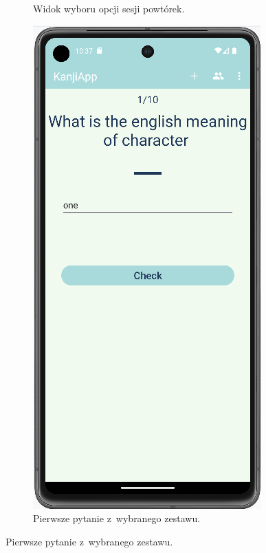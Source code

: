 \documentclass[a4paper,twoside,12pt]{book}
\begin{document}
\begin{figure}
\begin{subfigure}{0.3\textwidth}
   \caption{Widok wyboru opcji sesji powtórek.}
   \label{fig:options}
\end{subfigure}
\hfill
\begin{subfigure}{0.3\textwidth}
   \includegraphics[width=\textwidth]{learn/start}
   \caption{Pierwsze pytanie z~wybranego zestawu.}
   \label{fig:start}
\end{subfigure}


\end{figure}
\end{document}
